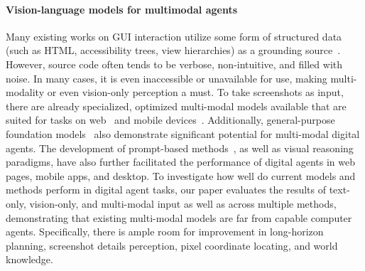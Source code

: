 \paragraph{Vision-language models for multimodal agents}
Many existing works on GUI interaction utilize some form of structured data (such as HTML, accessibility trees, view hierarchies) as a grounding source~\citep{deng2023mind2web, gur2023real, li2020mapping, nakano2021webgpt, zhao2022tie, sridhar2023hierarchical, zhang2024large, zhou2023webarena}. 
However, source code often tends to be verbose, non-intuitive, and filled with noise. 
In many cases, it is even inaccessible or unavailable for use, making multi-modality or even vision-only perception a must.
To take screenshots as input, there are already specialized, optimized multi-modal models available that are suited for tasks on web~\citep{Baechler2024ScreenAIAV, furuta2023multimodal, humphreys2022data, lee2023pix2struct, shaw2023pixels} and mobile devices~\citep{hong2023cogagent, zhang2023you}. 
Additionally, general-purpose foundation models~\citep{bai2023qwen, li2023silkie, liu2023visual, zhu2023minigpt} also demonstrate significant potential for multi-modal digital agents.
The development of prompt-based methods~\citep{gao2023assistgui, he2024webvoyager, yan2023gpt, zheng2024gpt}, as well as visual reasoning paradigms, have also further facilitated the performance of digital agents in web pages, mobile apps, and desktop. 
To investigate how well do current models and methods perform in digital agent tasks, our paper evaluates the results of text-only, vision-only, and multi-modal input as well as across multiple methods, demonstrating that existing multi-modal models are far from capable computer agents.
Specifically, there is ample room for improvement in long-horizon planning, screenshot details perception, pixel coordinate locating, and world knowledge.

